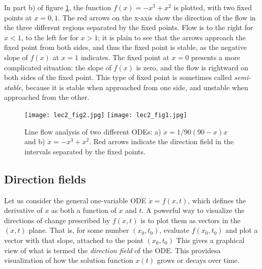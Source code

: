 \documentclass[11pt]{book}
\begin{document}
In part b) of  figure \ref{fig:line_flow_example}, the function $f(x) =  -x^3 + x^2 $ is plotted, with two fixed points at $x = 0, 1$. The red arrows on the x-axis show the direction of the flow in the three different regions separated by the fixed points. Flow is to the right for $x<1$, to the left for for $x>1$; it is plain to see that the arrows approach the fixed point from both sides, and thus the fixed point  is stable, as the negative slope of $f(x)$ at  $x=1$ indicates.  The fixed point at $x=0$ presents a more complicated situation: the slope of $f(x)$ is zero, and the flow is rightward on both sides of the fixed point. This type of fixed point is sometimes called \emph{semi-stable}, because it is stable when approached from one side, and unstable when approached from the other.

\begin{figure}[htbp] %
   \centering

   \texttt{[image: lec2\_fig2.jpg]}
    \texttt{[image: lec2\_fig1.jpg]}
   \caption{Line flow analysis of two different ODEs: a) $\dot x = 1/90(90-x)x$ and b)  $ \dot x = -x^3 + x^2 $. Red arrows indicate the direction field in the intervals separated by the fixed points.}
   \label{fig:line_flow_example}
\end{figure}

\subsection{Direction fields}
Let us consider the general one-variable ODE $\dot x = f(x,t)$, which defines the derivative of $x$ as both a function of $x$ and $t$. A powerful way to visualize the directions of change prescribed by $f(x,t)$ is to plot them as vectors in the $(x,t)$ plane. That is, for some number $(x_0,t_0)$, evaluate $f(x_0,t_0)$ and plot a vector with that slope, attached to the point $(x_0,t_0)$ This gives a graphical view of what is termed the \emph{direction field} of the ODE. This providesa visualization of how the solution function $x(t)$ grows or decays over time.
\end{document}
